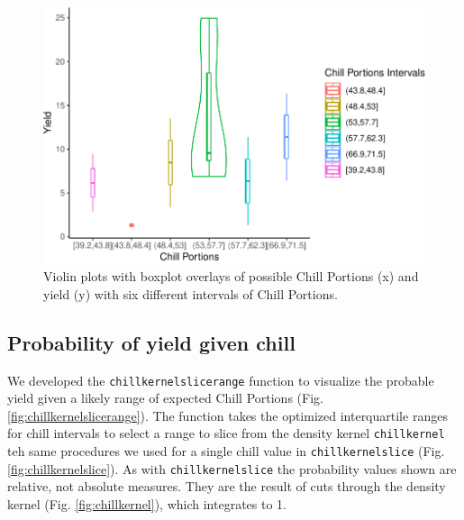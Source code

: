 \documentclass[]{article}
\begin{document}
\begin{figure}
\centering
\includegraphics{Abstract_SHE_Chill_Yield_Model_files/figure-latex/chillviolin-1.pdf}
\caption{\label{fig:chillviolin}Violin plots with boxplot overlays of
possible Chill Portions (x) and yield (y) with six different intervals
of Chill Portions.}
\end{figure}

\hypertarget{probability-of-yield-given-chill}{%
\subsection{Probability of yield given
chill}\label{probability-of-yield-given-chill}}

We developed the \texttt{chillkernelslicerange} function to visualize
the probable yield given a likely range of expected Chill Portions (Fig.
\ref{fig:chillkernelslicerange}). The function takes the optimized
interquartile ranges for chill intervals to select a range to slice from
the density kernel \texttt{chillkernel} teh same procedures we used for
a single chill value in \texttt{chillkernelslice} (Fig.
\ref{fig:chillkernelslice}). As with \texttt{chillkernelslice} the
probability values shown are relative, not absolute measures. They are
the result of cuts through the density kernel (Fig.
\ref{fig:chillkernel}), which integrates to 1.
\end{document}
